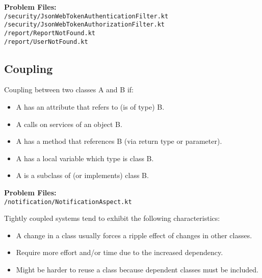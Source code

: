 \documentclass[11pt]{article}
\begin{document}
\begin{center}

\textbf{Problem Files:} \\
\texttt{/security/JsonWebTokenAuthenticationFilter.kt} \\
\texttt{/security/JsonWebTokenAuthorizationFilter.kt} \\
\texttt{/report/ReportNotFound.kt} \\
\texttt{/report/UserNotFound.kt}

\end{center}

\subsection{Coupling}

Coupling between two classes A and B if:

\begin{itemize}
  \setlength\itemsep{0.1em}
    \item A has an attribute that refers to (is of type) B.
    \item A calls on services of an object B.
    \item A has a method that references B (via return type or parameter).
    \item A has a local variable which type is class B.
    \item A is a subclass of (or implements) class B.
\end{itemize}

\begin{center}

\textbf{Problem Files:} \\
\texttt{/notification/NotificationAspect.kt} \\
\end{center}

Tightly coupled systems tend to exhibit the following characteristics:
\begin{itemize}
  \setlength\itemsep{0.1em}
    \item A change in a class usually forces a ripple effect of changes in other classes.
    \item Require more effort and/or time due to the increased dependency.
    \item Might be harder to reuse a class because dependent classes must be included.
\end{itemize}
\end{document}
